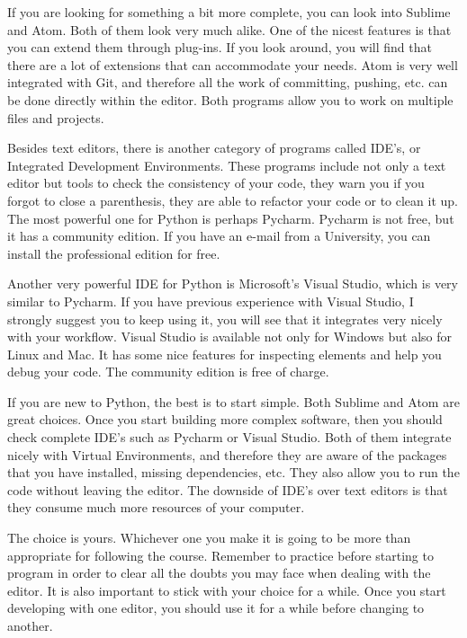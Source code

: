 If you are looking for something a bit more complete, you can look into Sublime and Atom. Both of them look very much alike. One of the nicest features is that you can extend them through plug-ins. If you look around, you will find that there are a lot of extensions that can accommodate your needs. Atom is very well integrated with Git, and therefore all the work of committing, pushing, etc. can be done directly within the editor. Both programs allow you to work on multiple files and projects.

Besides text editors, there is another category of programs called IDE’s, or Integrated Development Environments. These programs include not only a text editor but tools to check the consistency of your code, they warn you if you forgot to close a parenthesis, they are able to refactor your code or to clean it up. The most powerful one for Python is perhaps Pycharm. Pycharm is not free, but it has a community edition. If you have an e-mail from a University, you can install the professional edition for free.

Another very powerful IDE for Python is Microsoft’s Visual Studio, which is very similar to Pycharm. If you have previous experience with Visual Studio, I strongly suggest you to keep using it, you will see that it integrates very nicely with your workflow. Visual Studio is available not only for Windows but also for Linux and Mac. It has some nice features for inspecting elements and help you debug your code. The community edition is free of charge.

If you are new to Python, the best is to start simple. Both Sublime and Atom are great choices. Once you start building more complex software, then you should check complete IDE’s such as Pycharm or Visual Studio. Both of them integrate nicely with Virtual Environments, and therefore they are aware of the packages that you have installed, missing dependencies, etc. They also allow you to run the code without leaving the editor. The downside of IDE’s over text editors is that they consume much more resources of your computer.

The choice is yours. Whichever one you make it is going to be more than appropriate for following the course. Remember to practice before starting to program in order to clear all the doubts you may face when dealing with the editor. It is also important to stick with your choice for a while. Once you start developing with one editor, you should use it for a while before changing to another.
